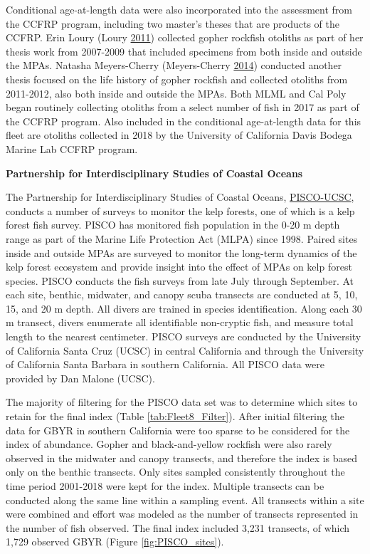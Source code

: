 \documentclass[12pt,]{article}
\begin{document}
Conditional age-at-length data were also incorporated into the
assessment from the CCFRP program, including two master's theses that
are products of the CCFRP. Erin Loury (Loury
\protect\hyperlink{ref-Loury2011}{2011}) collected gopher rockfish
otoliths as part of her thesis work from 2007-2009 that included
specimens from both inside and outside the MPAs. Natasha Meyers-Cherry
(Meyers-Cherry \protect\hyperlink{ref-MeyersCherry2014}{2014}) conducted
another thesis focused on the life history of gopher rockfish and
collected otoliths from 2011-2012, also both inside and outside the
MPAs. Both MLML and Cal Poly began routinely collecting otoliths from a
select number of fish in 2017 as part of the CCFRP program. Also
included in the conditional age-at-length data for this fleet are
otoliths collected in 2018 by the University of California Davis Bodega
Marine Lab CCFRP program.

\textbf{Partnership for Interdisciplinary Studies of Coastal Oceans}

The Partnership for Interdisciplinary Studies of Coastal Oceans,
\href{http://www.piscoweb.org/kelp-forest-study}{PISCO-UCSC}, conducts a
number of surveys to monitor the kelp forests, one of which is a kelp
forest fish survey. PISCO has monitored fish population in the 0-20 m
depth range as part of the Marine Life Protection Act (MLPA) since 1998.
Paired sites inside and outside MPAs are surveyed to monitor the
long-term dynamics of the kelp forest ecosystem and provide insight into
the effect of MPAs on kelp forest species. PISCO conducts the fish
surveys from late July through September. At each site, benthic,
midwater, and canopy scuba transects are conducted at 5, 10, 15, and 20
m depth. All divers are trained in species identification. Along each 30
m transect, divers enumerate all identifiable non-cryptic fish, and
measure total length to the nearest centimeter. PISCO surveys are
conducted by the University of California Santa Cruz (UCSC) in central
California and through the University of California Santa Barbara in
southern California. All PISCO data were provided by Dan Malone (UCSC).

The majority of filtering for the PISCO data set was to determine which
sites to retain for the final index (Table \ref{tab:Fleet8_Filter}).
After initial filtering the data for GBYR in southern California were
too sparse to be considered for the index of abundance. Gopher and
black-and-yellow rockfish were also rarely observed in the midwater and
canopy transects, and therefore the index is based only on the benthic
transects. Only sites sampled consistently throughout the time period
2001-2018 were kept for the index. Multiple transects can be conducted
along the same line within a sampling event. All transects within a site
were combined and effort was modeled as the number of transects
represented in the number of fish observed. The final index included
3,231 transects, of which 1,729 observed GBYR (Figure
\ref{fig:PISCO_sites}).
\end{document}
